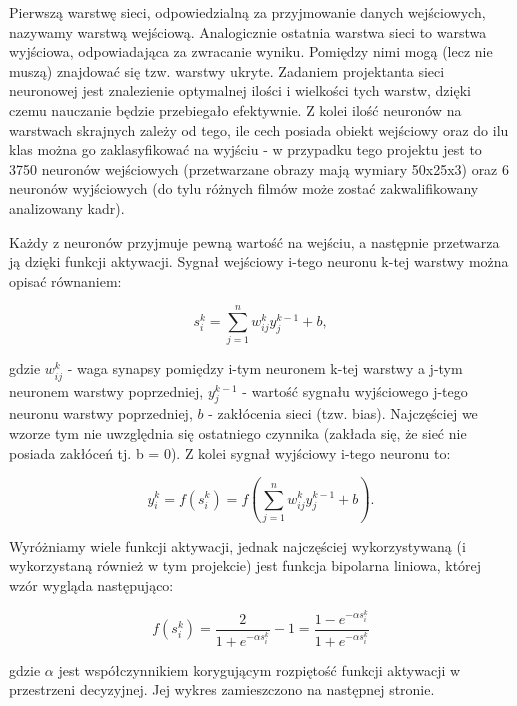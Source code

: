 \documentclass[12pt,a4paper]{article}
\begin{document}
	\vspace{5pt}
	Pierwszą warstwę sieci, odpowiedzialną za przyjmowanie danych wejściowych, nazywamy warstwą wejściową. Analogicznie ostatnia warstwa sieci to warstwa wyjściowa, odpowiadająca za zwracanie wyniku. Pomiędzy nimi mogą (lecz nie muszą) znajdować się tzw. warstwy ukryte. Zadaniem projektanta sieci neuronowej jest znalezienie optymalnej ilości i wielkości tych warstw, dzięki czemu nauczanie będzie przebiegało efektywnie. Z kolei ilość neuronów na warstwach skrajnych zależy od tego, ile cech posiada obiekt wejściowy oraz do ilu klas można go zaklasyfikować na wyjściu - w przypadku tego projektu jest to 3750 neuronów wejściowych (przetwarzane obrazy mają wymiary 50x25x3) oraz 6 neuronów wyjściowych (do tylu różnych filmów może zostać zakwalifikowany analizowany kadr).
	
	\vspace{5pt}
	Każdy z neuronów przyjmuje pewną wartość na wejściu, a następnie przetwarza ją dzięki funkcji aktywacji. Sygnał wejściowy i-tego neuronu k-tej warstwy można opisać równaniem:
	
	\begin{equation*}
	    s^k_i = \sum_{j=1}^{n}w^k_{ij} y^{k-1}_{j} + b,
	\end{equation*}
	
	\noindent gdzie $w^k_{ij}$ - waga synapsy pomiędzy i-tym neuronem k-tej warstwy a j-tym neuronem warstwy poprzedniej, $y^{k-1}_{j}$ - wartość sygnału wyjściowego j-tego neuronu warstwy poprzedniej, $b$ - zakłócenia sieci (tzw. bias). Najczęściej we wzorze tym nie uwzględnia się ostatniego czynnika (zakłada się, że sieć nie posiada zakłóceń tj. b = 0). Z kolei sygnał wyjściowy i-tego neuronu to:
	
	\begin{equation*}
	    y^k_i = f(s^k_i) = f(\sum_{j=1}^{n}w^k_{ij} y^{k-1}_{j} + b).
	\end{equation*}
	
	Wyróżniamy wiele funkcji aktywacji, jednak najczęściej wykorzystywaną (i wykorzystaną również w tym projekcie) jest funkcja bipolarna liniowa, której wzór wygląda następująco:
	
	\begin{equation*}
	    f(s^k_i) = \frac{2}{1 + e^{-\alpha s^k_i}} - 1 = \frac{1 - e^{-\alpha s^k_i}}{1 + e^{-\alpha s^k_i}}
	\end{equation*}
	
	\noindent gdzie $\alpha$ jest współczynnikiem korygującym rozpiętość funkcji aktywacji w przestrzeni decyzyjnej. Jej wykres zamieszczono na następnej stronie.
\end{document}
